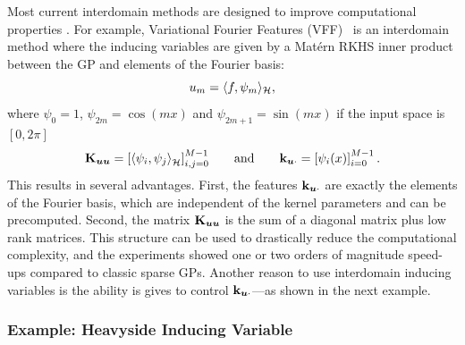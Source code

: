 Most current interdomain methods are designed to improve computational properties \citep{hensman2017variational,Dutordoir2020spherical,burt2020variational}. For example, Variational Fourier Features (VFF)~\citep{hensman2017variational} is an interdomain method where the inducing variables are given by a Mat\'ern RKHS inner product between the GP and elements of the Fourier basis:
\begin{equation*}
u_m = \langle f, \psi_m \rangle_{{\mathcal{H}}},
\end{equation*}
where $\psi_0 = 1$, $\psi_{2m}=\cos(m x)$ and $\psi_{2m+1}=\sin(m x)$ if the input space is $[0, 2 \pi]$
\begin{equation*}
    \Kuu = \left[\langle \psi_i , \psi_{j} \rangle_\rkhs^{} \right]_{i, j = 0}^{M-1}\qquad\text{and}\qquad\kux = \left[ \psi_i(x)\right]_{i = 0}^{M-1}\, .
\end{equation*}
This results in several advantages. First, the features $\mathbf{k}_{\bm{u} \cdot}$ are exactly the elements of the Fourier basis, which are independent of the kernel parameters and can be precomputed. Second, the matrix $\mathbf{{K}}_{\bm{u} \bm{u}}$ is the sum of a diagonal matrix plus low rank matrices. This structure can be used to drastically reduce the computational complexity, and the experiments showed one or two orders of magnitude speed-ups compared to classic sparse GPs. Another reason to use interdomain inducing variables is the ability is gives to control $\mathbf{k}_{\bm{u} \cdot}$---as shown in the next example.

\subsubsection*{Example: Heavyside Inducing Variable}


